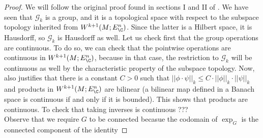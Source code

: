 \begin{proof}
    We will follow the original proof found in sections I and II of \parencite{mitter1981bundle}. We have seen that \(\mathscr{G}_k\) is a group, and it is a topological space with respect to the subspace topology inherited from \(W^{k+1}(M;E_\C^n)\). Since the latter is a Hilbert space, it is Hausdorff, so \(\mathscr{G}_k\) is Hausdorff as well. Let us check first that the group operations are continuous. To do so, we can check that the pointwise operations are continuous in \(W^{k+1}(M;E_\C^n)\), because in that case, the restriction to \(\mathscr{G}_k\) will be continuous as well by the characteristic property of the subspace topology. Now, \parencite[Lemma B.5]{wehrheim2004uhlenbeck} also justifies that there is a constant \(C>0\) such that \(||\phi \cdot \psi ||_k \leq C \cdot ||\phi||_k \cdot ||\psi||_k\) and products in \(W^{k+1}(M;E_\C^n)\) are bilinear (a bilinear map defined in a Banach space is continuous if and only if it is bounded). This shows that products are continuous. To check that taking inverses is continuous {\color{red}???}  \\

    Observe that we require \(G\) to be connected becasue the codomain of \(\exp_G\) is the connected component of the identity 


\end{proof}

